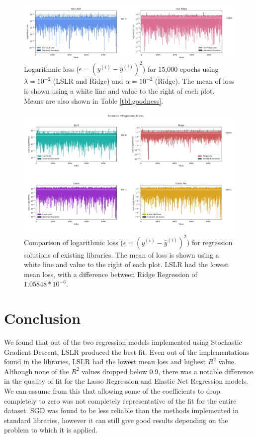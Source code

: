 \documentclass[letterpaper]{article} %
\begin{document}
\begin{figure}[htbp]
\centerline{\includegraphics[width=\textwidth]{my_evaluation.png}}
\caption{Logarithmic loss ($\epsilon = (y^{(i)} - \hat{y}^{(i)})^2$) for 15,000 epochs using
$\lambda = 10^{-2}$ (LSLR and Ridge) and $\alpha = 10^{-2}$ (Ridge).
The mean of loss is shown using a white line and value to the right of each plot.
Means are also shown in Table \ref{tbl:goodness}.}
\label{fig:my_evaluation}
\end{figure}

\begin{figure}[htbp]
\centerline{\includegraphics[width=\textwidth]{lib_evaluation.png}}
\caption{Comparison of logarithmic loss ($\epsilon = (y^{(i)} - \hat{y}^{(i)})^2$) for regression
solutions of existing libraries.
The mean of loss is shown using a white line and value to the right of each plot.
LSLR had the lowest mean loss, with a difference between Ridge Regression of
$1.05848*10^{-6}$.}
\label{fig:lib_evaluation}
\end{figure}

\section{Conclusion}
We found that out of the two regression models implemented using Stochastic Gradient Descent,
LSLR produced the best fit. Even out of the implementations found in the libraries,
LSLR had the lowest mean loss and highest $R^2$ value.
Although none of the $R^2$ values dropped below 0.9,
there was a notable difference in the quality of fit for the
Lasso Regression and Elastic Net Regression models.
We can assume from this that allowing some of the coefficients to drop completely to zero
was not completely representative of the fit for the entire dataset.
SGD was found to be less reliable than the methods implemented in standard libraries,
however it can still give good results depending on the problem to which it is applied.
\end{document}
